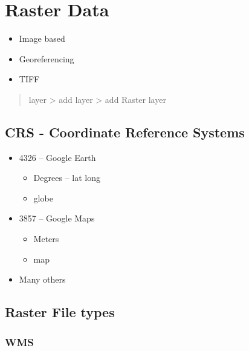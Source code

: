 \documentclass[
]{book}
\providecommand{\tightlist}{%
  \setlength{\itemsep}{0pt}\setlength{\parskip}{0pt}}
\begin{document}
\hypertarget{raster-data}{%
\chapter{Raster Data}\label{raster-data}}

\begin{itemize}
\tightlist
\item
  Image based
\item
  Georeferencing
\item
  TIFF
\end{itemize}

\begin{quote}
layer \textgreater{} add layer \textgreater{} add Raster layer
\end{quote}

\hypertarget{crs---coordinate-reference-systems}{%
\section{CRS - Coordinate Reference Systems}\label{crs---coordinate-reference-systems}}

\begin{itemize}
\tightlist
\item
  4326 -- Google Earth

  \begin{itemize}
  \tightlist
  \item
    Degrees -- lat long
  \item
    globe
  \end{itemize}
\item
  3857 -- Google Maps

  \begin{itemize}
  \tightlist
  \item
    Meters
  \item
    map
  \end{itemize}
\item
  Many others
\end{itemize}

\hypertarget{raster-file-types}{%
\section{Raster File types}\label{raster-file-types}}

\hypertarget{wms}{%
\subsection{WMS}\label{wms}}
\end{document}
